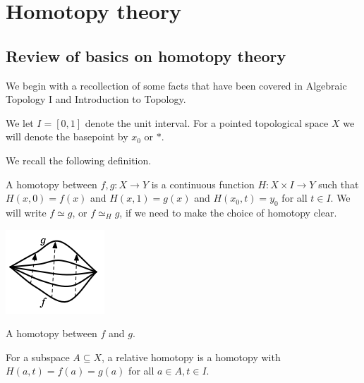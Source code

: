 \documentclass[ma3408.tex]{subfiles}
\begin{document}
\chapter{Homotopy theory}
\section{Review of basics on homotopy theory}
We begin with a recollection of some facts that have been covered in Algebraic Topology I and Introduction to Topology. 
\begin{Not}
We let $I = [0,1]$ denote the unit interval. For a pointed topological space $X$ we will denote the basepoint by $x_0$ or $\ast$. 
\end{Not}
We recall the following definition. 
\begin{Def}
	A homotopy between $f,g \colon X \to Y$ is a continuous function $H \colon X \times I \to Y$ such that $H(x,0) = f(x)$ and $H(x,1) = g(x)$ and $H(x_0,t) = y_0$ for all $t \in I$. We will write $f \simeq g$, or $f \simeq_H g$, if we need to make the choice of homotopy clear. \begin{marginfigure} \centering\includegraphics[scale = 0.5]{path_homotopy}\caption{A homotopy between $f$ and $g$.}\label{fig:marginfig}\end{marginfigure}

	For a subspace $A \subseteq X$, a relative homotopy is a homotopy with $H(a,t) = f(a) = g(a)$ for all $a \in A, t \in I$. 
	\end{Def}
\end{document}
